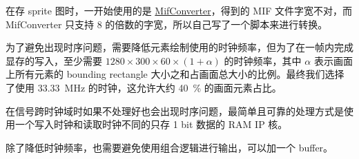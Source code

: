 \documentclass[UTF8, 11pt, fontset=none]{ctexart}
\begin{document}
在存 sprite 图时，一开始使用的是 \href{https://github.com/thu-cs-lab/MifConverter}{MifConverter}，得到的 MIF 文件字宽不对，而 MifConverter 只支持 8 的倍数的字宽，所以自己写了一个脚本来进行转换。

为了避免出现时序问题，需要降低元素绘制使用的时钟频率，但为了在一帧内完成显存的写入，至少需要 $1280 \times 300 \times 60 \times (1+\alpha)$ 的时钟频率，其中 $\alpha$ 表示画面上所有元素的 bounding rectangle 大小之和占画面总大小的比例。最终我们选择了使用 \SI{33.33}{\mega\hertz} 的时钟，这允许大约 \SI{40}{\percent} 的画面元素占比。

在信号跨时钟域时如果不处理好也会出现时序问题，最简单且可靠的处理方式是使用一个写入时钟和读取时钟不同的只存 1 bit 数据的 RAM IP 核。

除了降低时钟频率，也需要避免使用组合逻辑进行输出，可以加一个 buffer。
\end{document}
